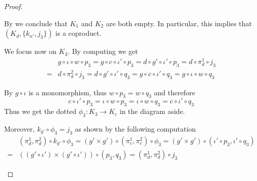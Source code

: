 \documentclass[3p]{elsarticle}
\def\E{\textbf {\textup{E}}}
\newcommand{\commentato}[1]{ {} }
\newcommand{\id}[1]{\mathsf{id}_{#1}}
\theoremstyle{remark}
\theoremstyle{definition}
\begin{document}
\begin{proof}
\begin{enumerate}
By  we conclude that $K_1$ and $K_2$
are both empty. In particular, this implies that $(K_d, \{k_{n'}, j_3\})$ is a coproduct.


We focus now on $K_3$. By computing we get
	\begin{align*}
	&g\circ \iota \circ w\circ p_3=g\circ c\circ \iota'\circ p_3=d\circ g'\circ \iota'\circ p_3=d\circ \pi^1_d\circ j_3\\=&d\circ \pi^2_d\circ j_3=d\circ g'\circ \iota' \circ q_3=g\circ c\circ \iota'\circ q_3=g\circ \iota \circ w\circ q_3
	\end{align*}

\noindent
\begin{minipage}[l]{.3\linewidth}
\end{minipage}\hfill
\begin{minipage}[r]{.7\linewidth}
	By  $g\circ \iota$ is a monomorphism, thus $w\circ p_3=w\circ q_3$ and therefore
	\[c\circ \iota'\circ p_3=\iota\circ w\circ p_3=\iota \circ w\circ q_3=c\circ \iota'\circ q_3\]
	Thus we get the dotted $\phi_3\colon K_3\to K_c$ in the diagram aside.
\end{minipage}

Moreover, $k_{g'}\circ \phi_3=j_3$ as shown by the following computation
\begin{align*}
&(\pi^1_d, \pi^2_d)\circ k_{g'}\circ \phi_3=(g'\times g')\circ (\pi^1_c, \pi^2_c)\circ \phi_3=(g'\times g')\circ (\iota'\circ p_3, \iota'\circ q_3)\\=&((g'\circ \iota') \times (g'\circ \iota'))\circ (p_3, q_3)=(\pi^1_d, \pi^2_d)\circ j_3
\end{align*}
 
 \commentato{ 
 
 	\smallskip
 \parbox{7.5cm}{We can go further. The outer part of the diagram on the right commutes, so that we have the dotted $\psi_0\circ K_b\to K_0$.
 Now, on the one hand $\phi_0\circ \psi_0=\id{K_b}$ because if we compute we get
  \[(\pi^1_b, \pi^2_b)\circ \phi_0\circ \psi_0=(p_0, q_0)\circ \psi_0=(\pi^1_b, \pi^2_b)\]}\hfill \parbox{4cm}{\vspace{-.5cm}\xymatrix{K_b \ar[dr]_{(\pi^1_b, \pi^2_b)}  \ar@{>->}@/^.4cm/[rr]^{k_{n'}} \ar@{.>}[r]_{\psi_0}& K_0 \ar@{>->}[r]_{j_0}  \ar[d]^{(p_0, q_0)}& K_d   \ar[d]^{(\pi^1_d, \pi^2_d)} \\
 	& B'\times B' \ar@{>->}[r]_-{n'\times n'} & D'\times D' }
 	}

}
\end{enumerate}
\end{proof}
\end{document}
